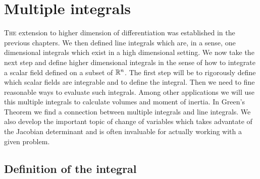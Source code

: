 \chapter{Multiple integrals}
\bookletstart

\lettrine{T}{he} extension to higher dimension of differentiation was established in the previous chapters.
We then defined line integrals which are, in a sense, one dimensional integrals which exist in a high dimensional setting.
We now take the next step and define higher dimensional integrals in the sense of how to integrate a scalar field defined on a subset of \(\mathbb{R}^n\).
The first step will be to rigorously define which scalar fields are integrable and to define the integral.
Then we need to fine reasonable ways to evaluate such integrals.
Among other applications we will use this multiple integrals to calculate volumes and moment of inertia.
In Green's Theorem we find a connection between multiple integrals and line integrals.
We also develop the important topic of change of variables which takes advantate of the Jacobian determinant and is often invaluable for actually working with a given problem.

\section{Definition of the integral}

